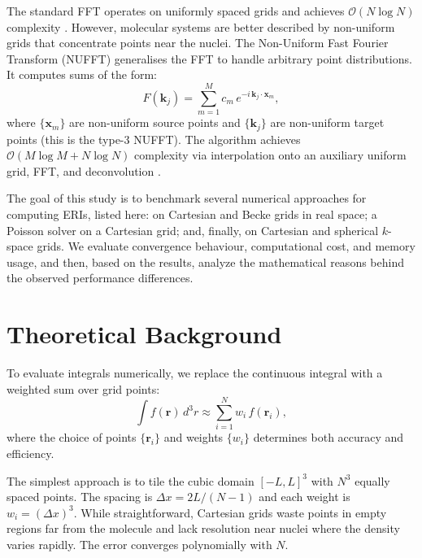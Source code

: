 \documentclass[12pt,a4paper]{article}
\begin{document}
The standard FFT operates on uniformly spaced grids and achieves $\mathcal{O}(N\log N)$ complexity \cite{app151910563}. However, molecular systems are better described by non-uniform grids that concentrate points near the nuclei. The Non-Uniform Fast Fourier Transform (NUFFT) generalises the FFT to handle arbitrary point distributions. It computes sums of the form:
\begin{equation}
 F(\mathbf{k}_j) = \sum_{m=1}^{M} c_m\,e^{-i\,\mathbf{k}_j \cdot \mathbf{x}_m},
    \label{eq:nufft}
\end{equation}
where $\{\mathbf{x}_m\}$ are non-uniform source points and $\{\mathbf{k}_j\}$ are non-uniform target points (this is the type-3 NUFFT). The algorithm achieves $\mathcal{O}(M\log M + N\log N)$ complexity via interpolation onto an auxiliary uniform grid, FFT, and deconvolution \cite{barnett2019}.

The goal of this study is to benchmark several numerical approaches for computing ERIs, listed here: on Cartesian and Becke grids in real space; a Poisson solver on a Cartesian grid; and, finally, on Cartesian and spherical $k$-space grids.
We evaluate convergence behaviour, computational cost, and memory usage, and then, based on the results, analyze the mathematical reasons behind the observed performance differences.


\section{Theoretical Background}
\label{sec:theory}

To evaluate integrals numerically, we replace the continuous integral with a weighted sum over grid points:
\begin{equation}
    \int f(\mathbf{r})\,d^3r \approx \sum_{i=1}^{N} w_i\,f(\mathbf{r}_i),
    \label{eq:quadrature}
\end{equation}
where the choice of points $\{\mathbf{r}_i\}$ and weights $\{w_i\}$ determines both accuracy and efficiency.

The simplest approach is to tile the cubic domain $[-L, L]^3$ with $N^3$ equally spaced points. The spacing is $\Delta x = 2L/(N-1)$ and each weight is $w_i = (\Delta x)^3$. While straightforward, Cartesian grids waste points in empty regions far from the molecule and lack resolution near nuclei where the density varies rapidly. The error converges polynomially with $N$.
\end{document}
